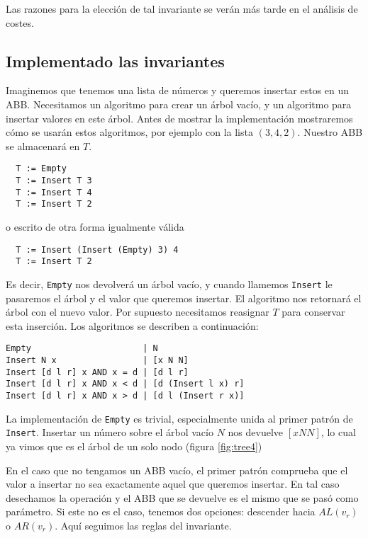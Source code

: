 \documentclass[10pt,spanish,twocolumn]{article}
\begin{document}
Las razones para la elección de tal invariante se verán más tarde en el 
análisis de costes.

\subsection{Implementado las invariantes}
Imaginemos que tenemos una lista de números y queremos insertar estos en un 
ABB.  Necesitamos un algoritmo para crear un árbol vacío, y un algoritmo para 
insertar valores en este árbol.  Antes de mostrar la implementación mostraremos 
cómo se usarán estos algoritmos, por ejemplo con la lista $(3, 4, 2)$.  Nuestro 
ABB se almacenará en $T$.

\begin{lstlisting}
  T := Empty
  T := Insert T 3
  T := Insert T 4
  T := Insert T 2
\end{lstlisting}

o escrito de otra forma igualmente válida

\begin{lstlisting}
  T := Insert (Insert (Empty) 3) 4
  T := Insert T 2
\end{lstlisting}

Es decir, \texttt{Empty} nos devolverá un árbol vacío, y cuando llamemos 
\texttt{Insert} le pasaremos el árbol y el valor que queremos insertar.  El 
algoritmo nos retornará el árbol con el nuevo valor.  Por supuesto necesitamos 
reasignar $T$ para conservar esta inserción.  Los algoritmos se describen a 
continuación:

\begin{lstlisting}
Empty                      | N
Insert N x                 | [x N N]
Insert [d l r] x AND x = d | [d l r]
Insert [d l r] x AND x < d | [d (Insert l x) r]
Insert [d l r] x AND x > d | [d l (Insert r x)]
\end{lstlisting}

La implementación de \texttt{Empty} es trivial, especialmente unida al primer 
patrón de \texttt{Insert}.  Insertar un número sobre el árbol vacío $N$ nos 
devuelve $[x N N]$, lo cual ya vimos que es el árbol de un solo nodo (figura 
\ref{fig:tree4})

En el caso que no tengamos un ABB vacío, el primer patrón comprueba que el 
valor a insertar no sea exactamente aquel que queremos insertar.  En tal caso 
desechamos la operación y el ABB que se devuelve es el mismo que se pasó como 
parámetro.  Si este no es el caso, tenemos dos opciones: descender hacia 
$AL(v_r)$ o $AR(v_r)$.  Aquí seguimos las reglas del invariante.
\end{document}
